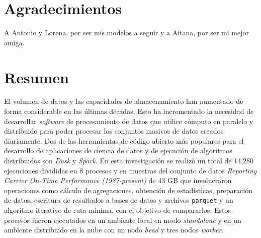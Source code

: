 \documentclass[11pt, oneside]{book}
\begin{document}
\chapter*{Agradecimientos}

\noindent A Antonio y Lorena, por ser mis modelos a seguir y a Aitana, por ser mi mejor amiga.



\chapter*{Resumen}

\noindent El volumen de datos y las capacidades de almacenamiento han aumentado de forma considerable en las últimas décadas. Esto ha incrementado la necesidad de desarrollar \textit{software} de procesamiento de datos que utilice cómputo en paralelo y distribuido para poder procesar los conjuntos masivos de datos creados diariamente. Dos de las herramientas de código abierto más populares para el desarrollo de aplicaciones de ciencia de datos y de ejecución de algoritmos distribuidos son \textit{Dask} y \textit{Spark}. En esta investigación se realizó un total de 14,280 ejecuciones divididas en 8 procesos y en muestras del conjunto de datos \textit{Reporting Carrier On-Time Performance (1987-present)} de 43 GB que involucraron operaciones como cálculo de agregaciones, obtención de estadísticas, preparación de datos, escritura de resultados a bases de datos y archivos \texttt{parquet} y un algoritmo iterativo de ruta mínima, con el objetivo de compararlos. Estos procesos fueron ejecutados en un ambiente local en modo \textit{standalone} y en un ambiente distribuido en la nube con un nodo \textit{head} y tres nodos \textit{worker}.
\end{document}
